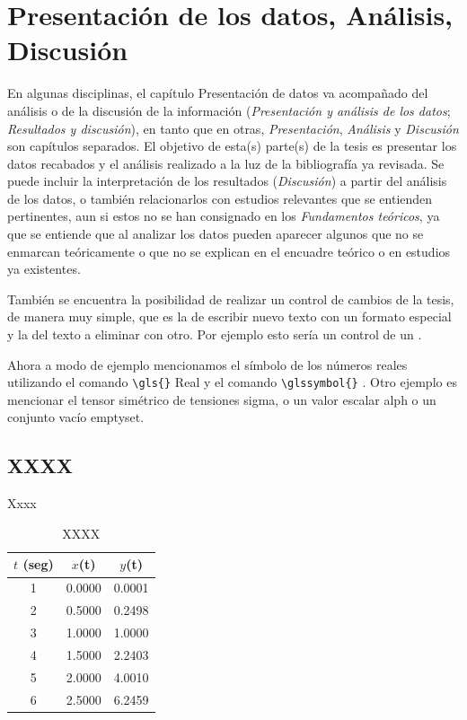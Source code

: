 \chapter{Presentación de los datos, Análisis, Discusión}

En algunas disciplinas, el capítulo Presentación de datos va acompañado del análisis o de la discusión de la información (\textit{Presentación y análisis de los datos}; \textit{Resultados y discusión}), en tanto que en otras, \textit{Presentación}, \textit{Análisis} y \textit{Discusión} son capítulos separados.
El objetivo de esta(s) parte(s) de la tesis es presentar los datos recabados y el análisis realizado a la luz de la bibliografía ya revisada. Se puede incluir la interpretación de los resultados (\textit{Discusión}) a partir del análisis de los datos, o también relacionarlos con estudios relevantes que se entienden pertinentes, aun si estos no se han consignado en los \textit{Fundamentos teóricos}, ya que se entiende que al analizar los datos pueden aparecer algunos que no se enmarcan teóricamente o que no se explican en el encuadre teórico o en estudios ya existentes.

También se encuentra la posibilidad de realizar un control de cambios de la tesis, de manera muy simple, que es la de escribir nuevo texto con un formato especial y la del texto a eliminar con otro. Por ejemplo esto sería un control de un  .


Ahora a modo de ejemplo mencionamos el símbolo de los números reales utilizando el comando \verb|\gls{}| \gls{Real} y el comando \verb|\glssymbol{}| . Otro ejemplo es mencionar el tensor simétrico de tensiones \gls{sigma}, o un valor escalar  \gls{alph} o un conjunto vacío \gls{emptyset}.



\section{XXXX}

Xxxx

\begin{table}[h!]
\centering
\caption{XXXX}
\label{tab:comp}
\begin{tabular}{|c|c|c|}
  \hline
  $t$ (seg) & $x$(t) & $y$(t)\\
  \hline
  1 & 0.0000 & 0.0001\\
  2 & 0.5000 & 0.2498\\
  3 & 1.0000 & 1.0000\\
  4 & 1.5000 & 2.2403\\
  5 & 2.0000 & 4.0010\\
  6 & 2.5000 & 6.2459\\
  \hline
\end{tabular}
\end{table}

